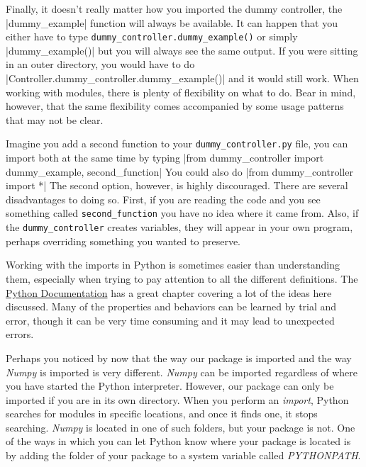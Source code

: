 Finally, it doesn't really matter how you imported the dummy controller, the |dummy_example| function will always be available. It can happen that you either have to type \texttt{dummy_controller.dummy_example()} or simply |dummy_example()| but you will always see the same output. If you were sitting in an outer directory, you would have to do |Controller.dummy_controller.dummy_example()| and it would still work. When working with modules, there is plenty of flexibility on what to do. Bear in mind, however, that the same flexibility comes accompanied by some usage patterns that may not be clear.

Imagine you add a second function to your \texttt{dummy_controller.py} file, you can import both at the same time by typing
|from dummy_controller import dummy_example, second_function| You could also do |from dummy_controller import *| The
second option, however, is highly discouraged. There are several disadvantages to doing so. First, if you are reading the code and you
see something called \texttt{second_function} you have no idea where it came from. Also, if the \texttt{dummy_controller} creates variables, they will appear in your own program, perhaps overriding something you wanted to preserve.


Working with the imports in Python is sometimes easier than understanding them, especially when trying to pay attention to all the different definitions. The \href{https://docs.python.org/3.6/tutorial/modules.html}{Python Documentation} has a great chapter covering a lot of the ideas here
discussed. Many of the properties and behaviors can be learned by trial and error, though it can be very time consuming and it may lead to unexpected errors.

Perhaps you noticed by now that the way our package is imported and the way \emph{Numpy} is imported is very different. \emph{Numpy} can be
imported regardless of where you have started the Python interpreter. However, our package can only be imported if you are in its own directory. When you perform an \emph{import}, Python searches for modules in specific locations, and once it finds one, it stops searching. \emph{Numpy} is located in one of such folders, but your package is not. One of the ways in which you can let Python know where your package is located is by adding the folder of your package to a system variable called \emph{PYTHONPATH}.


